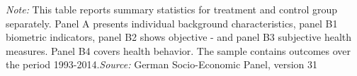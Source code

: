 \vspace{-1cm}\hspace{1.5cm}
\begin{minipage}{1.35\textwidth} %
{\footnotesize \textit{Note:} This table reports summary statistics for treatment and control group separately. Panel A presents individual background characteristics, panel B1 biometric indicators, panel B2 shows objective - and panel B3 subjective health measures. Panel B4 covers health behavior. The sample contains outcomes over the period 1993-2014.\newline \textit{Source: }German Socio-Economic Panel, version 31\par}
\end{minipage}
